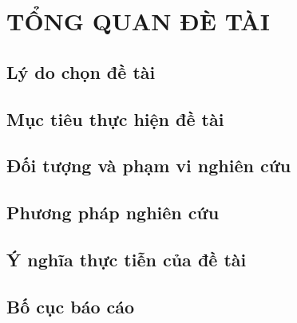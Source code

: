 \section{TỔNG QUAN ĐÈ TÀI}
\subsection{Lý do chọn đề tài}
\subsection{Mục tiêu thực hiện đề tài}
\subsection{Đối tượng và phạm vi nghiên cứu}
\subsection{Phương pháp nghiên cứu}
\subsection{Ý nghĩa thực tiễn của đề tài}
\subsection{Bố cục báo cáo}